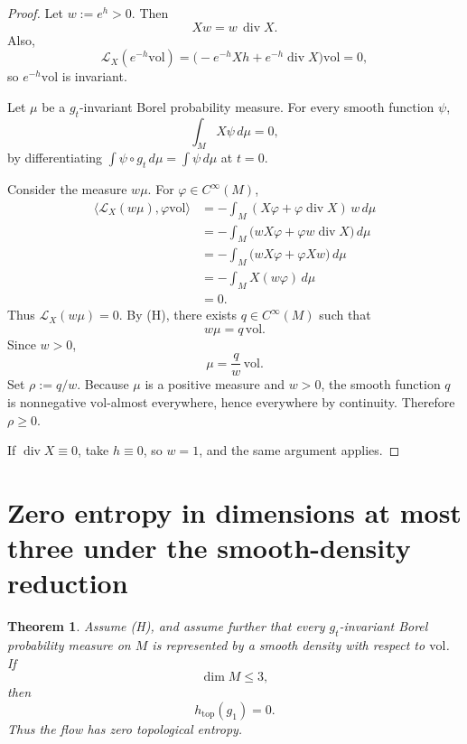 \documentclass[12pt]{article}
\newtheorem{theorem}{Theorem}[section]
\theoremstyle{definition}
\newcommand{\vol}{\mathrm{vol}}
\DeclareMathOperator{\Div}{div}
\begin{document}
\begin{proof}
Let \(w:=e^h>0\).  Then
\[
Xw=w\,\Div X .
\]
Also,
\[
\mathcal L_X(e^{-h}\vol)
=
\bigl(-e^{-h}Xh+e^{-h}\Div X\bigr)\vol
=
0,
\]
so \(e^{-h}\vol\) is invariant.

Let \(\mu\) be a \(g_t\)-invariant Borel probability measure.  For every smooth function \(\psi\),
\[
\int_M X\psi\,d\mu=0,
\]
by differentiating \(\int \psi\circ g_t\,d\mu=\int\psi\,d\mu\) at \(t=0\).

Consider the measure \(w\mu\).  For \(\varphi\in C^\infty(M)\),
\[
\begin{aligned}
\langle \mathcal L_X(w\mu),\varphi\vol\rangle
&=
-\int_M (X\varphi+\varphi\Div X)\,w\,d\mu \\
&=
-\int_M \bigl(wX\varphi+\varphi w\Div X\bigr)\,d\mu \\
&=
-\int_M \bigl(wX\varphi+\varphi Xw\bigr)\,d\mu \\
&=
-\int_M X(w\varphi)\,d\mu \\
&=0.
\end{aligned}
\]
Thus \(\mathcal L_X(w\mu)=0\).  By (H), there exists \(q\in C^\infty(M)\) such that
\[
w\mu=q\,\vol .
\]
Since \(w>0\),
\[
\mu=\frac{q}{w}\,\vol .
\]
Set \(\rho:=q/w\).  Because \(\mu\) is a positive measure and \(w>0\), the smooth function \(q\) is nonnegative \(\vol\)-almost everywhere, hence everywhere by continuity.  Therefore \(\rho\ge 0\).

If \(\Div X\equiv 0\), take \(h\equiv 0\), so \(w=1\), and the same argument applies.
\end{proof}

\section{Zero entropy in dimensions at most three under the smooth-density reduction}
\label{sec:entropy}

\begin{theorem}\label{thm:entropy-smooth-density}
Assume (H), and assume further that every \(g_t\)-invariant Borel probability measure on \(M\) is represented by a smooth density with respect to \(\vol\).  If
\[
\dim M\le 3,
\]
then
\[
h_{\mathrm{top}}(g_1)=0.
\]
Thus the flow has zero topological entropy.
\end{theorem}
\end{document}
